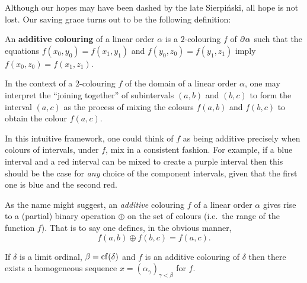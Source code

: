 Although our hopes may have been dashed by the late Sierpi\'nski, all hope is
not lost.  Our saving grace turns out to be the following definition:
\begin{dfn}
	An \textbf{additive colouring} of a linear order $\alpha$ is a $2$-colouring
	$f$ of $\partial^{}{\alpha}$ such that the equations $f(x_0,y_0)=f(x_1,y_1)$ and
	$f(y_0,z_0)=f(y_1,z_1)$ imply $f(x_0,z_0)=f(x_1,z_1)$.
\end{dfn}

In the context of a $2$-colouring $f$ of the domain of a linear order $\alpha$,
one may interpret the ``joining together'' of subintervals $(a,b)$ and $(b,c)$
to form the interval $(a,c)$ as the process of mixing the colours $f(a,b)$ and
$f(b,c)$ to obtain the colour $f(a,c)$.

In this intuitive framework, one could think of $f$ as being additive precisely
when colours of intervals, under $f$, mix in a consistent fashion.  For example,
if a blue interval and a red interval can be mixed to create a purple interval
then this should be the case for \textit{any} choice of the component intervals,
given that the first one is blue and the second red.

\begin{rem}
	As the name might suggest, an \textit{additive} colouring $f$ of a linear
	order $\alpha$ gives rise to a (partial) binary operation $\oplus$ on the
	set of colours (i.e.\ the range of the function $f$).  That is to say one
	defines, in the obvious manner,
	\begin{equation}
		f(a,b)\oplus f(b,c)=f(a,c).
	\end{equation}
\end{rem}

\begin{thm}
	If $\delta$ is a limit ordinal, $\beta=\operatorname{cf}(\delta)$ and $f$ is an additive
	colouring of $\delta$ then there exists a homogeneous sequence
	$x=(\alpha_\gamma)_{\gamma<\beta}$ for $f$.
\end{thm}

